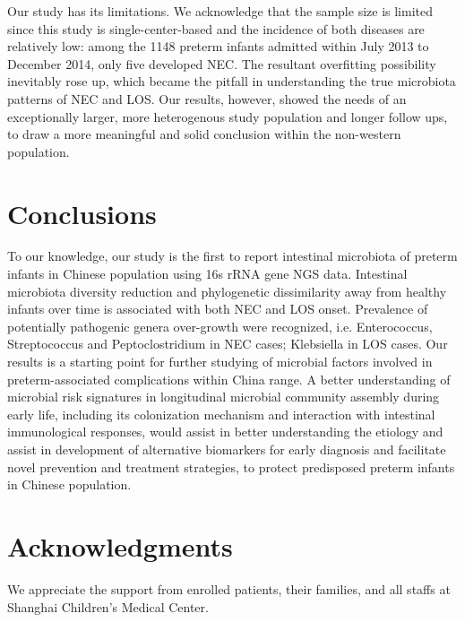 \documentclass[fleqn,10pt, lineno]{wlpeerj} %
\begin{document}
\noindent
Our study has its limitations. We acknowledge that the sample size is limited since this study is single-center-based and the incidence of both diseases are relatively low: among the 1148 preterm infants admitted within July 2013 to December 2014, only five developed NEC. The resultant overfitting possibility inevitably rose up, which became the pitfall in understanding the true microbiota patterns of NEC and LOS. Our results, however, showed the needs of an exceptionally larger, more heterogenous study population and longer follow ups, to draw a more meaningful and solid conclusion within the non-western population.

\section*{Conclusions}
To our knowledge, our study is the first to report intestinal microbiota of preterm infants in Chinese population using 16s rRNA gene NGS data. Intestinal microbiota diversity reduction and phylogenetic dissimilarity away from healthy infants over time is associated with both NEC and LOS onset. Prevalence of potentially pathogenic genera over-growth were recognized, i.e. Enterococcus, Streptococcus and Peptoclostridium in NEC cases; Klebsiella in LOS cases. Our results is a starting point for further studying of microbial factors involved in preterm-associated complications within China range. A better understanding of microbial risk signatures in longitudinal microbial community assembly during early life, including its colonization mechanism and interaction with intestinal immunological responses, would assist in better understanding the etiology and assist in development of alternative biomarkers for early diagnosis and facilitate novel prevention and treatment strategies, to protect predisposed preterm infants in Chinese population.

\section*{Acknowledgments}
We appreciate the support from enrolled patients, their families, and all staffs at Shanghai Children’s Medical Center.










\end{document}
